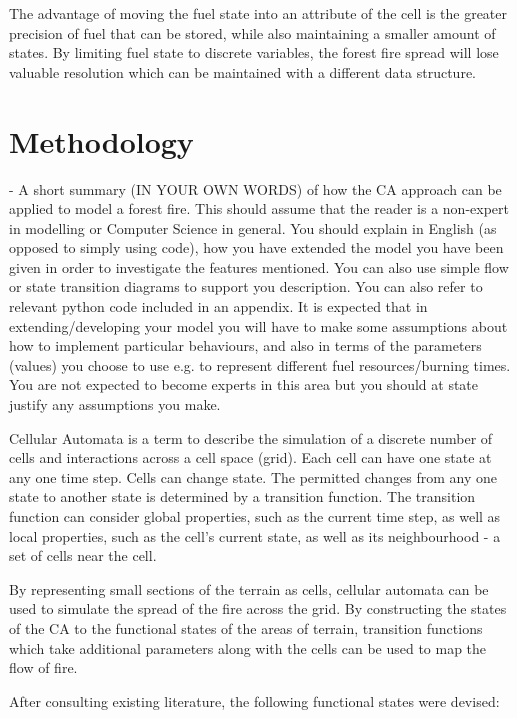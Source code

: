\documentclass[11pt, a4paper, titlepage]{article}
\begin{document}
  The advantage of moving the fuel state into an attribute of the cell is the greater precision of fuel that can be stored, while also maintaining a smaller amount of states. By limiting fuel state to discrete variables, the forest fire spread will lose valuable resolution which can be maintained with a different data structure.

\section{Methodology}
\begin{displayquote}
  - A short summary (IN YOUR OWN WORDS) of how the CA approach can
  be applied to model a forest fire. This should assume that the reader is a non-expert in modelling or
  Computer Science in general. You should explain in English (as opposed to simply using code), how
  you have extended the model you have been given in order to investigate the features mentioned.
  You can also use simple flow or state transition diagrams to support you description. You can also
  refer to relevant python code included in an appendix.
  It is expected that in extending/developing your model you will have to make some assumptions
  about how to implement particular behaviours, and also in terms of the parameters (values) you
  choose to use e.g. to represent different fuel resources/burning times. You are not expected to
  become experts in this area but you should at state justify any assumptions you make.
\end{displayquote} 

Cellular Automata is a term to describe the simulation of a discrete number of cells and interactions across a cell space (grid). Each cell can have one state at any one time step. Cells can change state. The permitted changes from any one state to another state is determined by a transition function. The transition function can consider global properties, such as the current time step, as well as local properties, such as the cell's current state, as well as its neighbourhood - a set of cells near the cell. 

By representing small sections of the terrain as cells, cellular automata can be used to simulate the spread of the fire across the grid. By constructing the states of the CA to the functional states of the areas of terrain, transition functions which take additional parameters along with the cells can be used to map the flow of fire.

After consulting existing literature, the following functional states were devised:
\end{document}
